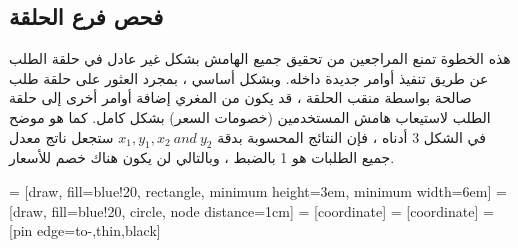 \documentclass[12pt, a4paper, leqno]{report}
\makeatletter
\newenvironment{figurehere}
 {\def\@captype{figure}}
 {}
\theoremstyle{plain}
\theoremstyle{definition}
\makeatother
\begin{document}
\begin{multicols}{2}
\begin{otherlanguage}{arabic}
\subsection{فحص فرع الحلقة}
هذه الخطوة تمنع المراجعين من تحقيق جميع الهامش بشكل غير عادل في حلقة الطلب عن طريق تنفيذ أوامر جديدة داخله. وبشكل أساسي ، بمجرد العثور على حلقة طلب صالحة بواسطة منقب الحلقة ، قد يكون من المغري إضافة أوامر أخرى إلى حلقة الطلب لاستيعاب هامش المستخدمين (خصومات السعر) بشكل كامل. كما هو موضح في الشكل 3 أدناه ، فإن النتائج المحسوبة بدقة $x_1, y_1, x_2\ and\ y_2$ ستجعل ناتج معدل جميع الطلبات هو 1 بالضبط ، وبالتالي لن يكون هناك خصم للأسعار.

\begin{center}
\begin{figurehere}
\centering
{} = [draw, fill=blue!20, rectangle, 
    minimum height=3em, minimum width=6em]
 = [draw, fill=blue!20, circle, node distance=1cm]
 = [coordinate]
 = [coordinate]
 = [pin edge={to-,thin,black}]

\end{figurehere}
\end{center}
\end{otherlanguage}
\end{multicols}
\end{document}
